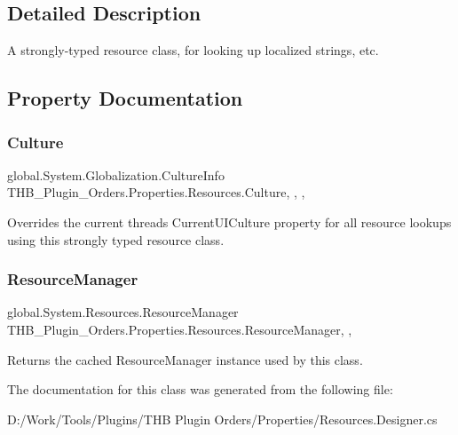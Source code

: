 \subsection{Detailed Description}
A strongly-\/typed resource class, for looking up localized strings, etc. 



\subsection{Property Documentation}
\mbox{\label{class_t_h_b___plugin___orders_1_1_properties_1_1_resources_abc067a0bcc5bdc35ac68752a464d42cc}} 
\subsubsection{\texorpdfstring{Culture}{Culture}}
{\footnotesize\ttfamily global.\+System.\+Globalization.\+Culture\+Info T\+H\+B\+\_\+\+Plugin\+\_\+\+Orders.\+Properties.\+Resources.\+Culture\hspace{0.3cm}{\ttfamily [static]}, {\ttfamily [get]}, {\ttfamily [set]}, {\ttfamily [package]}}



Overrides the current thread\textquotesingle{}s Current\+U\+I\+Culture property for all resource lookups using this strongly typed resource class. 

\mbox{\label{class_t_h_b___plugin___orders_1_1_properties_1_1_resources_af9431eab17864a9aff07751c973e07b4}} 
\subsubsection{\texorpdfstring{Resource\+Manager}{ResourceManager}}
{\footnotesize\ttfamily global.\+System.\+Resources.\+Resource\+Manager T\+H\+B\+\_\+\+Plugin\+\_\+\+Orders.\+Properties.\+Resources.\+Resource\+Manager\hspace{0.3cm}{\ttfamily [static]}, {\ttfamily [get]}, {\ttfamily [package]}}



Returns the cached Resource\+Manager instance used by this class. 



The documentation for this class was generated from the following file\+:\begin{DoxyCompactItemize}
\item 
D\+:/\+Work/\+Tools/\+Plugins/\+T\+H\+B Plugin Orders/\+Properties/Resources.\+Designer.\+cs\end{DoxyCompactItemize}
